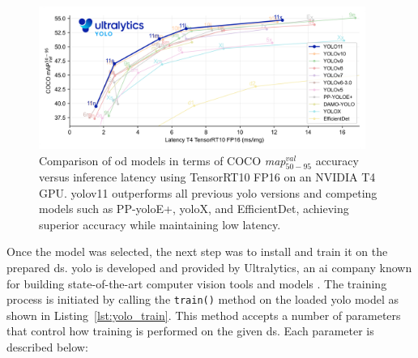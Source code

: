 \begin{figure}[!h]
    \centering
    \includegraphics[width=0.95\textwidth]{Figures/performance-comparison.png}
    \caption{Comparison of \gls{od} models in terms of COCO \textit{\gls{map}}$_{50-95}^{val}$ accuracy versus inference latency using TensorRT10 FP16 on an NVIDIA T4 GPU. \gls{yolo}v11 outperforms all previous \gls{yolo} versions and competing models such as PP-\gls{yolo}E+, \gls{yolo}X, and EfficientDet, achieving superior accuracy while maintaining low latency.}
    \label{yolo_comparison}
\end{figure}

Once the model was selected, the next step was to install and train it on the prepared \gls{ds}. \gls{yolo} is developed and provided by Ultralytics, an \gls{ai} company known for building state-of-the-art computer vision tools and models \cite{ultralytics}. The training process is initiated by calling the \texttt{train()} method on the loaded \gls{yolo} model as shown in Listing~\ref{lst:yolo_train}. This method accepts a number of parameters that control how training is performed on the given \gls{ds}. Each parameter is described below:

